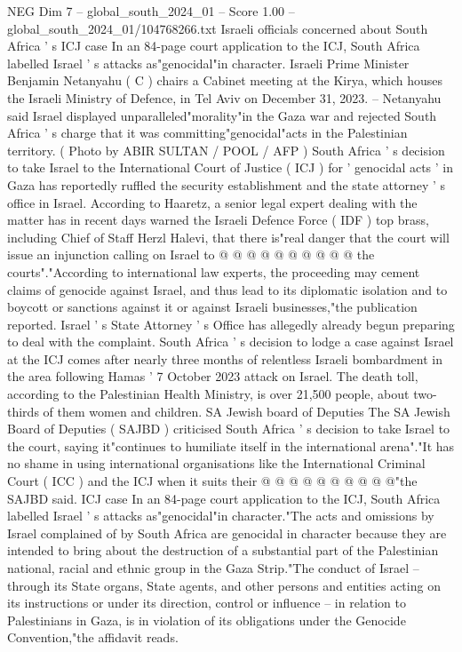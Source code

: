 \begin{textsample}{NEG Dim 7 – global\_south\_2024\_01 – Score 1.00 – global\_south\_2024\_01/104768266.txt}  \label{ex:f7_neg_149}
Israeli officials concerned about South Africa ' s ICJ case In an 84-page court application to the ICJ, South Africa labelled Israel ' s attacks as"genocidal"in character.
Israeli Prime Minister Benjamin Netanyahu ( C ) chairs a Cabinet meeting at the Kirya, which houses the Israeli Ministry of Defence, in Tel Aviv on December 31, 2023. -- Netanyahu said Israel displayed unparalleled"morality"in the Gaza war and rejected South Africa ' s charge that it was committing"genocidal"acts in the Palestinian territory. ( Photo by ABIR SULTAN / POOL / AFP ) South Africa ' s decision to take Israel to the International Court of Justice ( ICJ ) for ' genocidal acts ' in Gaza has reportedly ruffled the security establishment and the state attorney ' s office in Israel.
According to Haaretz, a senior legal expert dealing with the matter has in recent days warned the Israeli Defence Force ( IDF ) top brass, including Chief of Staff Herzl Halevi, that there is"real danger that the court will issue an injunction calling on Israel to @ @ @ @ @ @ @ @ @ @ the courts"."According to international law experts, the proceeding may cement claims of genocide against Israel, and thus lead to its diplomatic isolation and to boycott or sanctions against it or against Israeli businesses,"the publication reported.
Israel ' s State Attorney ' s Office has allegedly already begun preparing to deal with the complaint.
South Africa ' s decision to lodge a case against Israel at the ICJ comes after nearly three months of relentless Israeli bombardment in the area following Hamas ' 7 October 2023 attack on Israel.
The death toll, according to the Palestinian Health Ministry, is over 21,500 people, about two-thirds of them women and children.
SA Jewish board of Deputies The SA Jewish Board of Deputies ( SAJBD ) criticised South Africa ' s decision to take Israel to the court, saying it"continues to humiliate itself in the international arena"."It has no shame in using international organisations like the International Criminal Court ( ICC ) and the ICJ when it suits their @ @ @ @ @ @ @ @ @ @"the SAJBD said.
ICJ case In an 84-page court application to the ICJ, South Africa labelled Israel ' s attacks as"genocidal"in character."The acts and omissions by Israel complained of by South Africa are genocidal in character because they are intended to bring about the destruction of a substantial part of the Palestinian national, racial and ethnic group in the Gaza Strip."The conduct of Israel -- through its State organs, State agents, and other persons and entities acting on its instructions or under its direction, control or influence -- in relation to Palestinians in Gaza, is in violation of its obligations under the Genocide Convention,"the affidavit reads.

\end{textsample}
